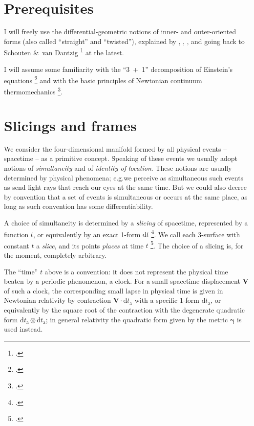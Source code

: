 \documentclass[\ifafour a4paper,12pt,\else a5paper,10pt,\fi%
onecolumn,oneside,article,%
british%
]{memoir}
\theoremstyle{remark}
\theoremstyle{innote}
\newcommand*{\citep}{\footcites}%
\newcommand*{\citey}{\footcites}%
\newcommand*{\amp}{\&}
\newcommand*{\di}{\mathrm{d}}%
\renewcommand*{\|}{\nonscript\,\vert\nonscript\;\mathopen{}}
\newcommand*{\sect}{\S}%
\newcommand*{\chap}{ch.}%
\newcommand*{\chaps}{chs}%
\newcommand*{\eg}{{e.g.}}
\newcommand*{\ytn}{t_{\textrm{a}}}
\newcommand*{\yffg}{\gamma}
\newcommand*{\yfg}{\bm{\yffg}}
\newcommand*{\ynn}{V}
\newcommand*{\yn}{\bm{\ynn}}
\begin{document}
\section{Prerequisites}
\label{sec:prereqs}

I will freely use the differential-geometric notions of inner- and
outer-oriented forms (also called \enquote{straight} and
\enquote{twisted}), explained by
\textcites{burke1995}[\chap~IV]{burke1985_r1987}{burke1983},
\textcites[\chaps~2, 3]{bossavit1991}{bossavit1998b},
\textcite[\chap~A]{hehletal2003}, and going back to Schouten \amp\ van
Dantzig \citey{schoutenetal1940} at the latest.

I will assume some familiarity with the \enquote{3~+~1} decomposition of
Einstein's equations \citep{smarretal1978,york1979,smarretal1980} and with
the basic principles of Newtonian continuum thermomechanics
\citep{truesdell1977_r1991,samohyletal1987_r2014,truesdelletal1960}.

\section{Slicings and frames}
\label{sec:slicing_frames}

We consider the four-dimensional manifold formed by all physical events --
spacetime -- as a primitive concept. Speaking of these events we usually
adopt notions of \emph{simultaneity} and of \emph{identity of location}.
These notions are usually determined by physical phenomena; \eg we perceive
as simultaneous such events as send light rays that reach our eyes at the
same time. But we could also decree by convention that a set of events is
simultaneous or occurs at the same place, as long as such convention has
some differentiability.

A choice of simultaneity is determined by a \emph{slicing} of spacetime,
represented by a function $t$, or equivalently by an exact 1-form $\di t$
\citep{york1979}. We call each 3-surface with constant $t$ a \emph{slice},
and its points \emph{places} at time $t$ \citep{smarretal1978,york1979,smarretal1980}[\sect~2.4]{marsdenetal1994}. The choice of a slicing is, for
the moment, completely arbitrary.

The \enquote{time} $t$ above is a convention: it does not represent the
physical time beaten by a periodic phenomenon, a clock. For a small
spacetime displacement $\yn$ of such a clock, the corresponding small lapse
in physical time is given in Newtonian relativity by contraction
$\yn\cdot\di\ytn$ with a specific 1-form $\di\ytn$, or equivalently by the
square root of the contraction with the degenerate quadratic form
$\di\ytn \otimes \di\ytn$; in general relativity the quadratic form given
by the metric $\yfg$ is used instead.
\end{document}
